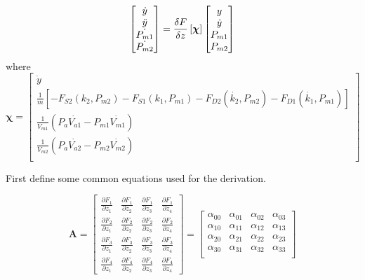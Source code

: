 \documentclass[11pt,a4paper]{article}
\begin{document}
\begin{appendices}
\begin{equation}
\begin{bmatrix}
        \dot{y}\\
        \ddot{y}\\
        \dot{P_{m1}}\\
        \dot{P_{m2}}\\
    \end{bmatrix}
    = \fdv{F}{z}\left[\boldsymbol{\chi}\right]
    \begin{bmatrix}
        y\\
        \dot{y}\\
        P_{m1}\\
        P_{m2}\\
    \end{bmatrix}
\end{equation}
where
\begin{equation*}
        \boldsymbol{\chi} = 
    \begin{bmatrix}
        \dot{y}\\
        \frac{1}{m}[-F_{S2}(k_2,P_{m2})-F_{S1}(k_1,P_{m1})-F_{D2}(\dot{k_2},P_{m2})-F_{D1}(\dot{k_1},P_{m1})]\\
        \frac{1}{V_{m1}}(P_a\dot{V_{a1}}-P_{m1}\dot{V_{m1}})\\
        \frac{1}{V_{m2}}(P_a\dot{V_{a2}}-P_{m2}\dot{V_{m2}})\\
    \end{bmatrix}
\end{equation*}

First define some common equations used for the derivation.

\begin{equation}
    \boldsymbol{A} =
    \begin{bmatrix}
    \frac{\partial F_1}{\partial z_1} & 
    \frac{\partial F_1}{\partial z_2} & 
    \frac{\partial F_1}{\partial z_3} &
    \frac{\partial F_1}{\partial z_4} \\[1ex] %
    \frac{\partial F_2}{\partial z_1} & 
    \frac{\partial F_2}{\partial z_2} & 
    \frac{\partial F_2}{\partial z_3} &
    \frac{\partial F_2}{\partial z_4} \\[1ex]
    \frac{\partial F_3}{\partial z_1} & 
    \frac{\partial F_3}{\partial z_2} & 
    \frac{\partial F_3}{\partial z_3} &
    \frac{\partial F_3}{\partial z_4} \\[1ex]
    \frac{\partial F_4}{\partial z_1} & 
    \frac{\partial F_4}{\partial z_2} & 
    \frac{\partial F_4}{\partial z_3} &
    \frac{\partial F_4}{\partial z_4} 
    \end{bmatrix}
    =
    \begin{bmatrix}
        \alpha_{00} & \alpha_{01} & \alpha_{02} & \alpha_{03}\\
        \alpha_{10} & \alpha_{11} & \alpha_{12} & \alpha_{13}\\
        \alpha_{20} & \alpha_{21} & \alpha_{22} & \alpha_{23}\\
        \alpha_{30} & \alpha_{31} & \alpha_{32} & \alpha_{33}\\
    \end{bmatrix}
\end{equation}


\end{appendices}
\end{document}
